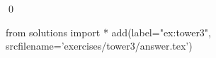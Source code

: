
\begin{ex} 
  \label{ex:tower3}
  
  \qed
\end{ex} 
\begin{python0}
from solutions import *
add(label="ex:tower3",
    srcfilename='exercises/tower3/answer.tex') 
\end{python0}
